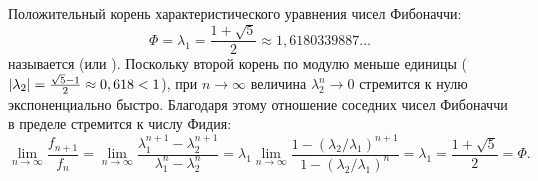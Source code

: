 \begin{remark}
    Положительный корень характеристического уравнения чисел Фибоначчи:
    \[
        \Phi = \lambda_1 = \frac{1 + \sqrt{5}}{2} \approx 1,6180339887\dots
    \]
    называется  (или ). 
    Поскольку второй корень по модулю меньше единицы 
    ($\left| \lambda_2 \right| = \frac{\sqrt{5} - 1}{2} \approx 0,618 < 1$), при 
    $n \to \infty$ величина $\lambda_2^n \to 0$ стремится к нулю 
    экспоненциально быстро. Благодаря этому отношение соседних чисел 
    Фибоначчи в пределе стремится к числу Фидия:
    \begin{equation} \label{eq:phidias_limit}
        \lim_{n \to \infty} \frac{f_{n+1}}{f_n} = 
        \lim_{n \to \infty} \frac{\lambda_1^{n+1} - \lambda_2^{n+1}}
        {\lambda_1^n - \lambda_2^n} = 
        \lambda_1 \lim_{n \to \infty} 
        \frac{1 - (\lambda_2 / \lambda_1)^{n+1}}{1 - (\lambda_2 / \lambda_1)^n} = 
        \lambda_1 = \frac{1 + \sqrt{5}}{2} = \Phi. \tag{16}
    \end{equation}
\end{remark}